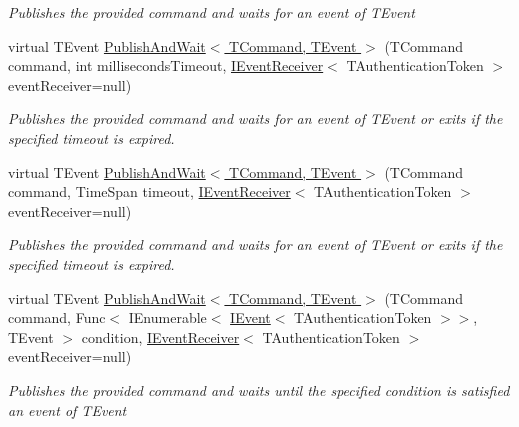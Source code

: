 \begin{DoxyCompactItemize}
\begin{DoxyCompactList}\small\item\em Publishes the provided {\itshape command}  and waits for an event of {\itshape T\+Event}  \end{DoxyCompactList}\item 
virtual T\+Event \hyperlink{classCqrs_1_1Akka_1_1Commands_1_1AkkaCommandBus_a7f820323e5293e476f4afee7c731f7a3_a7f820323e5293e476f4afee7c731f7a3}{Publish\+And\+Wait$<$ T\+Command, T\+Event $>$} (T\+Command command, int milliseconds\+Timeout, \hyperlink{interfaceCqrs_1_1Events_1_1IEventReceiver}{I\+Event\+Receiver}$<$ T\+Authentication\+Token $>$ event\+Receiver=null)
\begin{DoxyCompactList}\small\item\em Publishes the provided {\itshape command}  and waits for an event of {\itshape T\+Event}  or exits if the specified timeout is expired. \end{DoxyCompactList}\item 
virtual T\+Event \hyperlink{classCqrs_1_1Akka_1_1Commands_1_1AkkaCommandBus_ad50bff025d51c3b00b17ccaec2a4cefc_ad50bff025d51c3b00b17ccaec2a4cefc}{Publish\+And\+Wait$<$ T\+Command, T\+Event $>$} (T\+Command command, Time\+Span timeout, \hyperlink{interfaceCqrs_1_1Events_1_1IEventReceiver}{I\+Event\+Receiver}$<$ T\+Authentication\+Token $>$ event\+Receiver=null)
\begin{DoxyCompactList}\small\item\em Publishes the provided {\itshape command}  and waits for an event of {\itshape T\+Event}  or exits if the specified timeout is expired. \end{DoxyCompactList}\item 
virtual T\+Event \hyperlink{classCqrs_1_1Akka_1_1Commands_1_1AkkaCommandBus_ad318bfb71c5a8f5e13994edce9bad99e_ad318bfb71c5a8f5e13994edce9bad99e}{Publish\+And\+Wait$<$ T\+Command, T\+Event $>$} (T\+Command command, Func$<$ I\+Enumerable$<$ \hyperlink{interfaceCqrs_1_1Events_1_1IEvent}{I\+Event}$<$ T\+Authentication\+Token $>$$>$, T\+Event $>$ condition, \hyperlink{interfaceCqrs_1_1Events_1_1IEventReceiver}{I\+Event\+Receiver}$<$ T\+Authentication\+Token $>$ event\+Receiver=null)
\begin{DoxyCompactList}\small\item\em Publishes the provided {\itshape command}  and waits until the specified condition is satisfied an event of {\itshape T\+Event}  \end{DoxyCompactList}\item 
$$
\end{DoxyCompactItemize}
